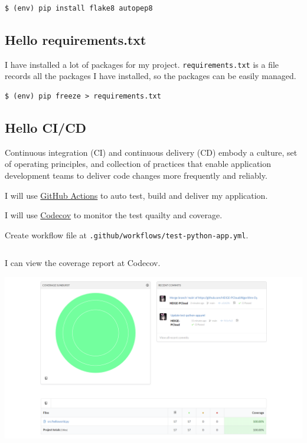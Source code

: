 \documentclass[a4paper]{report}
\begin{document}
\begin{verbatim}
$ (env) pip install flake8 autopep8
\end{verbatim}

\subsection{Hello requirements.txt}

I have installed a lot of packages for my project. \texttt{requirements.txt} is a file records all the packages I have installed, so the packages can be easily managed.

\begin{verbatim}
$ (env) pip freeze > requirements.txt
\end{verbatim}

\subsection{Hello CI/CD}

Continuous integration (CI) and continuous delivery (CD) embody a culture, set of operating principles, and collection of practices that enable application development teams to deliver code changes more frequently and reliably.

I will use \href{https://github.com/features/actions}{GitHub Actions} to auto test, build and deliver my application. 

I will use \href{https://codecov.io/}{Codecov} to monitor the test quailty and coverage.

Create workflow file at \texttt{.github/workflows/test-python-app.yml}.

\inputminted{yaml}{../.github/workflows/build-app.yml}

I can view the coverage report at Codecov.

\includegraphics[width=\linewidth]{Codecov.png}
\end{document}
